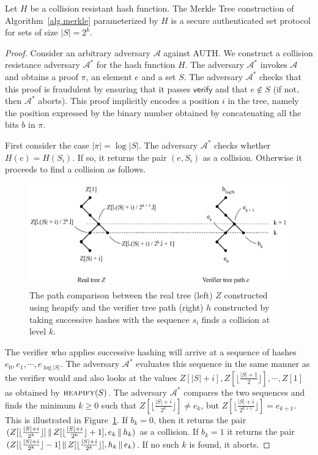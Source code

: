 \begin{theorem}[Security]
  Let $H$ be a collision resistant hash function. The Merkle Tree
  construction of Algorithm~\ref{alg.merkle} parameterized by $H$ is a secure
  authenticated set protocol for sets of size $|S| = 2^k$.
\end{theorem}
\begin{proof}
Consider an arbitrary adversary $\mathcal{A}$ against \textsf{AUTH}. We
construct a collision resistance adversary $\mathcal{A}^*$ for the hash function
$H$. The adversary $\mathcal{A}^*$ invokes $\mathcal{A}$ and obtains a proof
$\pi$, an element $e$ and a set $S$. The adversary $\mathcal{A}^*$ checks that
this proof is fraudulent by ensuring that it passes $\textsf{verify}$ and that
$e \not\in S$ (if not, then $\mathcal{A}^*$ aborts). This proof implicitly
encodes a position $i$ in the tree, namely the position expressed by the binary
number obtained by concatenating all the bits $b$ in $\pi$.

First consider the case $|\pi| = \log|S|$. The adversary $\mathcal{A}^*$
checks whether $H(e) = H(S_i)$. If so, it returns the pair $(e, S_i)$ as a
collision. Otherwise it proceeds to find a collision as follows.

\begin{figure}[tb]%
  \centering
  \includegraphics[width=\textwidth]{chapters/background/figures/mtpf.pdf}
  \caption{
    The path comparison between the real tree (left) $Z$ constructed using
    \textsf{heapify} and the verifier tree path (right) $h$ constructed by
    taking successive hashes with the sequence $s_i$ finds a collision at level
    $k$.
  }
  \label{fig.mtpf}
\end{figure}%

The verifier who applies successive hashing will arrive at a
sequence of hashes $e_0, e_1,\allowbreak\cdots,\allowbreak e_{\log|S|}$. The
adversary $\mathcal{A}^*$ evaluates this sequence in the same manner as the
verifier would and also looks at the values $Z[|S| + i], Z[\lfloor \frac{|S| + 1}{2} \rfloor],
\cdots, Z[1]$ as obtained by $\textsc{heapify}(S)$. The adversary
$\mathcal{A}^*$ compares the two sequences and finds the minimum $k \geq 0$ such that
$Z[\lfloor \frac{|S| + i}{2^k} \rfloor] \neq e_k$, but
$Z[\lfloor \frac{|S| + i}{2^{k + 1}} \rfloor] = e_{k + 1}$. This is illustrated
in Figure~\ref{fig.mtpf}.
If $b_k = 0$,
then it returns the pair
$(Z[\lfloor \frac{|S| + i}{2^k} \rfloor] \,\|\, Z[\lfloor \frac{|S| + i}{2^k} \rfloor + 1],\allowbreak e_k \,\|\, h_k)$ as a
collision. If $b_k = 1$ it returns the pair
$(Z[\lfloor \frac{|S| + i}{2^k} \rfloor - 1]\,\|\, Z[\lfloor \frac{|S| + i}{2^k} \rfloor],\allowbreak h_k \,\|\, e_k)$. If no such $k$ is found, it aborts.


\end{proof}
